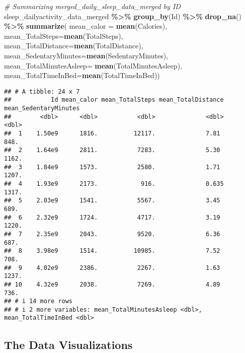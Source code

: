 \documentclass[
]{article}
\newenvironment{Shaded}{\begin{snugshade}}{\end{snugshade}}
\newcommand{\AttributeTok}[1]{\textcolor[rgb]{0.13,0.29,0.53}{#1}}
\newcommand{\CommentTok}[1]{\textcolor[rgb]{0.56,0.35,0.01}{\textit{#1}}}
\newcommand{\FunctionTok}[1]{\textcolor[rgb]{0.13,0.29,0.53}{\textbf{#1}}}
\newcommand{\NormalTok}[1]{#1}
\newcommand{\SpecialCharTok}[1]{\textcolor[rgb]{0.81,0.36,0.00}{\textbf{#1}}}
\begin{document}
\begin{Shaded}
\begin{Highlighting}[]
\CommentTok{\# Summarizing merged\_daily\_sleep\_data\_merged by ID}
\NormalTok{sleep\_dailyactivity\_data\_merged }\SpecialCharTok{\%\textgreater{}\%} 
  \FunctionTok{group\_by}\NormalTok{(Id) }\SpecialCharTok{\%\textgreater{}\%} 
  \FunctionTok{drop\_na}\NormalTok{() }\SpecialCharTok{\%\textgreater{}\%} 
  \FunctionTok{summarize}\NormalTok{( }\AttributeTok{mean\_calor =} \FunctionTok{mean}\NormalTok{(Calories), }\AttributeTok{mean\_TotalSteps=}\FunctionTok{mean}\NormalTok{(TotalSteps), }\AttributeTok{mean\_TotalDistance=}\FunctionTok{mean}\NormalTok{(TotalDistance), }\AttributeTok{mean\_SedentaryMinutes=}\FunctionTok{mean}\NormalTok{(SedentaryMinutes), }\AttributeTok{mean\_TotalMinutesAsleep=} \FunctionTok{mean}\NormalTok{(TotalMinutesAsleep),}
             \AttributeTok{mean\_TotalTimeInBed=}\FunctionTok{mean}\NormalTok{(TotalTimeInBed))}
\end{Highlighting}
\end{Shaded}

\begin{verbatim}
## # A tibble: 24 x 7
##           Id mean_calor mean_TotalSteps mean_TotalDistance mean_SedentaryMinutes
##        <dbl>      <dbl>           <dbl>              <dbl>                 <dbl>
##  1    1.50e9      1816.          12117.              7.81                   848.
##  2    1.64e9      2811.           7283.              5.30                  1162.
##  3    1.84e9      1573.           2580.              1.71                  1207.
##  4    1.93e9      2173.            916.              0.635                 1317.
##  5    2.03e9      1541.           5567.              3.45                   689.
##  6    2.32e9      1724.           4717.              3.19                  1220.
##  7    2.35e9      2043.           9520.              6.36                   687.
##  8    3.98e9      1514.          10985.              7.52                   708.
##  9    4.02e9      2386.           2267.              1.63                  1237.
## 10    4.32e9      2038.           7269.              4.89                   736.
## # i 14 more rows
## # i 2 more variables: mean_TotalMinutesAsleep <dbl>, mean_TotalTimeInBed <dbl>
\end{verbatim}

\subsection{The Data Visualizations}\label{the-data-visualizations}
\end{document}

